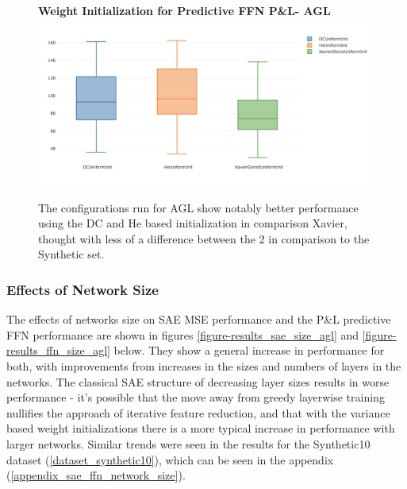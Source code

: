 \documentclass[a4paper,11pt,oneside]{article}
\theoremstyle{plain}
\theoremstyle{definition}
\begin{document}
\begin{figure}[H]
	\centering 
	\textbf{Weight Initialization for Predictive FFN P\&L- AGL} 
	\includegraphics[scale=0.35]{images/iteration_five/init5_ffn_init.png}
	\caption{
		\newline The configurations run for AGL show notably better performance using the DC and He based initialization in comparison Xavier, thought with less of a difference between the 2 in comparison to the Synthetic set.}
	\label{figure-init5_ffn_init}
\end{figure}



















\newpage
\subsubsection{Effects of Network Size}

The effects of networks size on SAE MSE performance and the P\&L predictive FFN performance are shown in figures \ref{figure-results_sae_size_agl} and \ref{figure-results_ffn_size_agl} below. They show a general increase in performance for both, with improvements from increases in the sizes and numbers of layers in the networks. The classical SAE structure of decreasing layer sizes results in worse performance - it's possible that the move away from greedy layerwise training nullifies the approach of iterative feature reduction, and that with the variance based weight initializations there is a more typical increase in performance with larger networks. Similar trends were seen in the results for the Synthetic10 dataset (\ref{dataset_synthetic10}), which can be seen in the appendix (\ref{appendix_sae_ffn_network_size}).\newline
\end{document}

